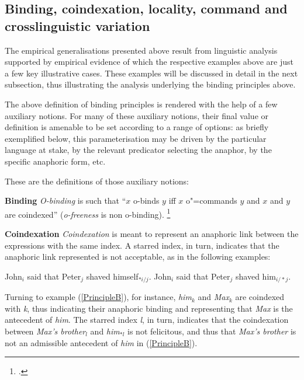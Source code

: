 \documentclass[output=paper
,modfonts
,nonflat]{langsci/langscibook}
\begin{document}
\subsection{Binding, coindexation, locality, command and crosslinguistic variation}\label{parameterisation}


The empirical generalisations presented above result from linguistic analysis supported by empirical
evidence of which the respective examples above are just a few key illustrative cases. These examples will be discussed
in detail in the next subsection, thus illustrating the analysis underlying the binding principles above.

The above definition of binding principles is rendered with the help of a few auxiliary
notions. For many of these auxiliary notions, their final value or definition is amenable to be
set according to a range of options: as briefly exemplified below, this parameterisation may be
driven by the particular language at stake, by the relevant predicator
selecting the anaphor, by the specific anaphoric form, etc.

These are the definitions of those auxiliary notions:

{\bf Binding} {\em O-binding} is such that ``$x$ o-binds $y$ iff $x$ o"=commands $y$ 
and $x$ and $y$ are coindexed'' ({\em o-freeness} is non o-binding).%
\footnote{\citep[]{polsag:hpsg94}.}

{\bf Coindexation} {\em Coindexation} is meant to represent an anaphoric link between the expressions 
with the same index. A starred index, in turn, indicates that the anaphoric link represented is not acceptable, as in the following examples:

\begin{exe}
\ex
\begin{xlist}
\ex John$_{i}$ said that Peter$_{j}$ shaved himself$_{*i/j}$.
\ex John$_{i}$ said that Peter$_{j}$ shaved him$_{i/*j}$.
\end{xlist}
\end{exe}

Turning to example (\ref{PrincipleB}), for instance, {\em him}$_{k}$ and {\em Max}$_{k}$ are
coindexed with {\em k}, thus indicating their anaphoric binding and representing that {\em Max} is the antecedent
of {\em him}. The starred index {\em *l}, in turn, indicates that the coindexation between  {\em Max's brother}$_{l}$
and {\em him}$_{*l}$ is not felicitous, and thus that {\em Max's brother} is not an admissible 
antecedent of {\em him} in (\ref{PrincipleB}).
\end{document}
